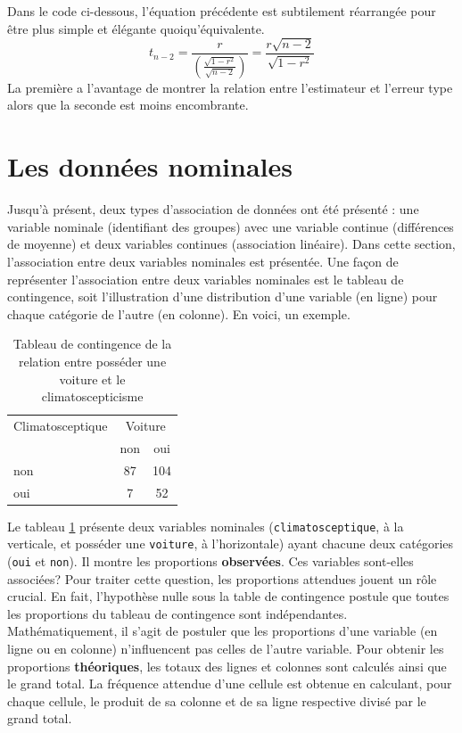 \documentclass[
]{book}
\begin{document}
Dans le code ci-dessous, l'équation précédente est subtilement réarrangée pour être plus simple et élégante quoiqu'équivalente.
\[ t_{n-2} = \frac{r}{(\frac{\sqrt{1-r^2}}{\sqrt{n-2}})} = \frac{r\sqrt{n-2}}{\sqrt{1-r^2}}\]
La première a l'avantage de montrer la relation entre l'estimateur et l'erreur type alors que la seconde est moins encombrante.

\hypertarget{les-donnuxe9es-nominales}{%
\section{Les données nominales}\label{les-donnuxe9es-nominales}}

Jusqu'à présent, deux types d'association de données ont été présenté : une variable nominale (identifiant des groupes) avec une variable continue (différences de moyenne) et deux variables continues (association linéaire). Dans cette section, l'association entre deux variables nominales est présentée. Une façon de représenter l'association entre deux variables nominales est le tableau de contingence, soit l'illustration d'une distribution d'une variable (en ligne) pour chaque catégorie de l'autre (en colonne). En voici, un exemple.

\begin{table}[H]

\caption{\label{tab:TCCV}Tableau de contingence de la relation entre posséder une voiture et le climatoscepticisme}
\centering
\begin{tabular}[t]{lcc}
\toprule
\multicolumn{1}{c}{Climatosceptique} & \multicolumn{2}{c}{Voiture} \\
\cmidrule(l{3pt}r{3pt}){1-1} \cmidrule(l{3pt}r{3pt}){2-3}
  & non & oui\\
\midrule
non & 87 & 104\\
oui & 7 & 52\\
\bottomrule
\end{tabular}
\end{table}

Le tableau \ref{tab:TCCV} présente deux variables nominales (\texttt{climatosceptique}, à la verticale, et posséder une \texttt{voiture}, à l'horizontale) ayant chacune deux catégories (\texttt{oui} et \texttt{non}). Il montre les proportions \textbf{observées}. Ces variables sont-elles associées? Pour traiter cette question, les proportions attendues jouent un rôle crucial. En fait, l'hypothèse nulle sous la table de contingence postule que toutes les proportions du tableau de contingence sont indépendantes. Mathématiquement, il s'agit de postuler que les proportions d'une variable (en ligne ou en colonne) n'influencent pas celles de l'autre variable. Pour obtenir les proportions \textbf{théoriques}, les totaux des lignes et colonnes sont calculés ainsi que le grand total. La fréquence attendue d'une cellule est obtenue en calculant, pour chaque cellule, le produit de sa colonne et de sa ligne respective divisé par le grand total.
\end{document}
